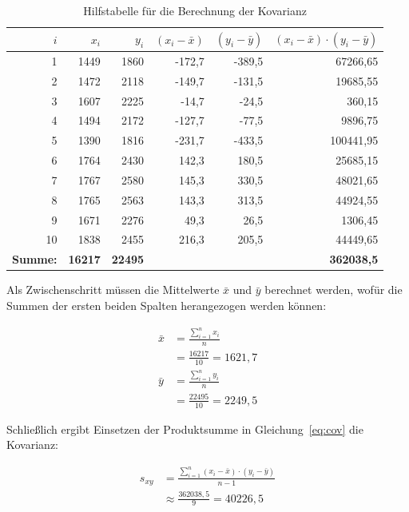 \documentclass[
  11pt,
  ngerman,
  a4paper,
]{report}
\begin{document}
\begin{table}

\caption{\label{tab:ricemath}\label{tab:ricemath}Hilfstabelle für die Berechnung der Kovarianz}
\centering
\begin{tabular}[t]{rrrrrr}
\toprule
$i$ & $x_i$ & $y_i$ & $(x_i-\bar{x})$ & $(y_i-\bar{y})$ & $(x_i-\bar{x})\cdot(y_i-\bar{y})$\\
\midrule
1 & 1449 & 1860 & -172,7 & -389,5 & 67266,65\\
2 & 1472 & 2118 & -149,7 & -131,5 & 19685,55\\
3 & 1607 & 2225 & -14,7 & -24,5 & 360,15\\
4 & 1494 & 2172 & -127,7 & -77,5 & 9896,75\\
5 & 1390 & 1816 & -231,7 & -433,5 & 100441,95\\
6 & 1764 & 2430 & 142,3 & 180,5 & 25685,15\\
7 & 1767 & 2580 & 145,3 & 330,5 & 48021,65\\
8 & 1765 & 2563 & 143,3 & 313,5 & 44924,55\\
9 & 1671 & 2276 & 49,3 & 26,5 & 1306,45\\
10 & 1838 & 2455 & 216,3 & 205,5 & 44449,65\\
\midrule
\textbf{Summe:} & \textbf{16217} & \textbf{22495} & \textbf{} & \textbf{} & \textbf{362038,5}\\
\bottomrule
\end{tabular}
\end{table}

Als Zwischenschritt müssen die Mittelwerte \(\bar{x}\) und \(\bar{y}\) berechnet werden, wofür die Summen der ersten beiden Spalten herangezogen werden können:

\[
\begin{aligned}
\bar{x}&=\frac{\sum\limits^n_{i=1}x_i}{n}\\[5pt]
       &=\frac{16217}{10}=1621,7\\[6pt]
\bar{y}&=\frac{\sum\limits^n_{i=1}y_i}{n}\\[5pt]
       &=\frac{22495}{10}=2249,5
\end{aligned}
\]

Schließlich ergibt Einsetzen der Produktsumme in Gleichung~\eqref{eq:cov} die Kovarianz:

\[\begin{aligned}
s_{xy}&=\frac{\sum\limits^n_{i=1}(x_i-\bar{x})\cdot(y_i-\bar{y})}{n-1}\\[5pt]
&\approx\frac{362038{,}5}{9}=40226{,}5
\end{aligned}\]
\end{document}
